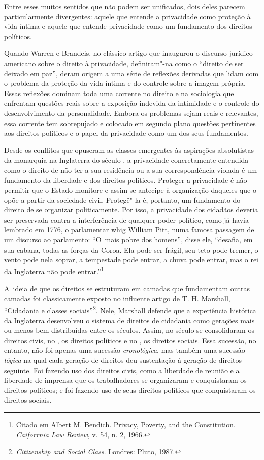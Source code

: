 Entre esses muitos sentidos que não podem ser unificados, dois deles
parecem particularmente divergentes: aquele que entende a privacidade
como proteção à vida íntima e aquele que entende privacidade como um
fundamento dos direitos políticos.

Quando Warren e Brandeis, no clássico artigo que inaugurou o discurso
jurídico americano sobre o direito à privacidade, definiram"-na como o
``direito de ser deixado em paz'', deram origem a uma série de reflexões
derivadas que lidam com o problema da proteção da vida íntima e do
controle sobre a imagem própria. Essas reflexões dominam toda uma
corrente no direito e na sociologia que enfrentam questões reais sobre a
exposição indevida da intimidade e o controle do desenvolvimento da
personalidade. Embora os problemas sejam reais e relevantes, essa
corrente tem sobrepujado e colocado em segundo plano questões
pertinentes aos direitos políticos e o papel da privacidade como um dos
seus fundamentos.

Desde os conflitos que opuseram as classes emergentes às aspirações
absolutistas da monarquia na Inglaterra do século , a privacidade
concretamente entendida como o direito de não ter a sua residência ou a
sua correspondência violada é um fundamento da liberdade e dos direitos
políticos. Proteger a privacidade é não permitir que o Estado monitore e
assim se antecipe à organização daqueles que o opõe a partir da
sociedade civil. Protegê"-la é, portanto, um fundamento do direito de se
organizar politicamente. Por isso, a privacidade dos cidadãos deveria
ser preservada contra a interferência de qualquer poder político, como
já havia lembrado em 1776, o parlamentar whig William Pitt, numa famosa
passagem de um discurso ao parlamento: ``O~mais pobre dos homens'', disse
ele, ``desafia, em sua cabana, todas as forças da Coroa. Ela pode ser
frágil, seu teto pode tremer, o vento pode nela soprar, a tempestade
pode entrar, a chuva pode entrar, mas o rei da Inglaterra não pode
entrar.''\footnote{Citado em Albert M. Bendich. Privacy,
  Poverty, and the Constitution. \emph{Caiforrnia Law Review}, v. 54, n.
  2, 1966. }

A~ideia de que os direitos se estruturam em camadas que fundamentam
outras camadas foi classicamente exposto no influente artigo de T. H.
Marshall, ``Cidadania e classes sociais''\footnote{\emph{Citizenship
  and Social Class}. Londres: Pluto, 1987.}. Nele, Marshall defende que
a experiência histórica da Inglaterra desenvolveu o sistema de direitos
de cidadania como gerações mais ou menos bem distribuídas entre os
séculos. Assim, no século  se consolidaram os direitos civis, no
, os direitos políticos e no , os direitos sociais. Essa sucessão,
no entanto, não foi apenas uma sucessão \emph{cronológica}, mas também
uma sucessão \emph{lógica} na qual cada geração de direitos deu
sustentação à geração de direitos seguinte. Foi fazendo uso dos direitos
civis, como a liberdade de reunião e a liberdade de imprensa que os
trabalhadores se organizaram e conquistaram os direitos políticos; e foi
fazendo uso de seus direitos políticos que conquistaram os direitos
sociais.

